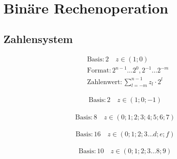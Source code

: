  
\chapter{Binäre Rechenoperation}

\section{Zahlensystem}

\begin{boxleft}
\end{boxleft}\begin{boxrightshaded}
\begin{align*}
&\text{Basis}:2\quad z\in\left(1;0\right)\\
&\text{Format}:2^{n-1} \dots 2^{0},2^{-1} \dots 2^{-m}\\
&\text{Zahlenwert}:\sum_{l=-m}^{n-1}z_l\cdot2^l
\end{align*}
\end{boxrightshaded}

\begin{boxleft}
\end{boxleft}\begin{boxrightshaded}
\begin{align*}
\text{Basis}:2\quad z\in\left(1;0;-1\right)
\end{align*}
\end{boxrightshaded}

\begin{boxleft}
\end{boxleft}\begin{boxrightshaded}
\begin{align*}
\text{Basis}:8\quad z\in\left(0;1;2;3;4;5;6;7\right)
\end{align*}
\end{boxrightshaded}

\begin{boxleft}
\end{boxleft}\begin{boxrightshaded}
\begin{align*}
\text{Basis}:16\quad z\in\left(0;1;2;3\dots d;e;f\right)
\end{align*}
\end{boxrightshaded}

\begin{boxleft}
\end{boxleft}\begin{boxrightshaded}
\begin{align*}
\text{Basis}:10\quad z\in\left(0;1;2;3\dots 8;9\right)
\end{align*}
\end{boxrightshaded}

